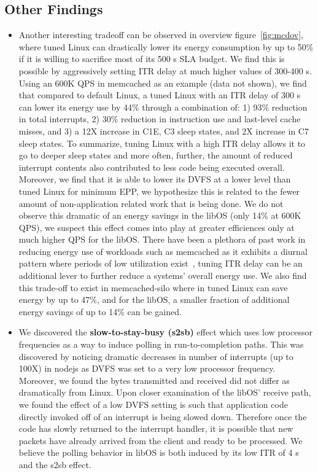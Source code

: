 \subsection{Other Findings}
\begin{itemize}
\item Another interesting tradeoff can be observed in overview figure~\ref{fig:mcdov}, where tuned Linux can drastically lower its energy consumption by up to 50\% if it is willing to sacrifice most of its 500 \micro s SLA budget. We find this is possible by aggressively setting ITR delay at much higher values of 300-400 \micro s. Using an 600K QPS in memcached as an example (data not shown), we find that compared to default Linux, a tuned Linux with an ITR delay of 300 \micro s can lower its energy use by 44\% through a combination of: 1) 93\% reduction in total interrupts, 2) 30\% reduction in instruction use and last-level cache misses, and 3) a 12X increase in C1E, C3 sleep states, and 2X increase in C7 sleep states. To summarize, tuning Linux with a high ITR delay allows it to go to deeper sleep states and more often, further, the amount of reduced interrupt contents also contributed to less code being executed overall. Moreover, we find that it is able to lower its DVFS at a lower level than tuned Linux for minimum EPP, we hypothesize this is related to the fewer amount of non-application related work that is being done. We do not observe this dramatic of an energy savings in the libOS (only 14\% at 600K QPS), we suspect this effect comes into play at greater efficiences only at much higher QPS for the libOS. There have been a plethora of past work in reducing energy use of workloads such as memcached as it exhibits a diurnal pattern where periods of low utilization exist~\cite{hotpower2008, powernap, napsac}, tuning ITR delay can be an additional lever to further reduce a systems' overall energy use. We also find this trade-off to exist in memcached-silo where in tuned Linux can save energy by up to 47\%, and for the libOS, a smaller fraction of additional energy savings of up to 14\% can be gained.

\item We discovered the \textbf{slow-to-stay-busy (s2sb)} effect which uses low processor frequencies as a way to induce polling in run-to-completion paths. This was discovered by noticing dramatic decreases in number of interrupts (up to 100X) in nodejs as DVFS was set to a very low processor frequency. Moreover, we found the bytes transmitted and received did not differ as dramatically from Linux. Upon closer examination of the libOS' receive path, we found the effect of a low DVFS setting is such that application code directly invoked off of an interrupt is being slowed down. Therefore once the code has slowly returned to the interrupt handler, it is possible that new packets have already arrived from the client and ready to be processed. We believe the polling behavior in libOS is both induced by its low ITR of 4 \micro s and the s2sb effect.

\end{itemize}
